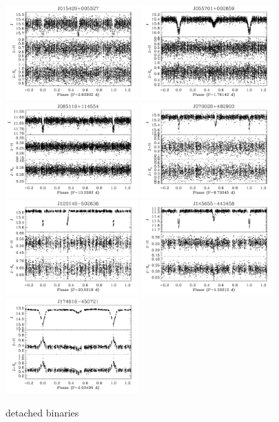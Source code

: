 \documentclass[]{emulateapj}
\begin{document}
\begin{figure}[]
\centering
\includegraphics[width=2.0in]{new_plots/bb3_0}
\includegraphics[width=2.0in]{new_plots/bb3_2}
\includegraphics[width=2.0in]{new_plots/bb3_3}
\includegraphics[width=2.0in]{new_plots/bb3_6}
\includegraphics[width=2.0in]{new_plots/bb3_10}
\includegraphics[width=2.0in]{new_plots/bb3_14}
\includegraphics[width=2.0in]{new_plots/bb3_16}
\caption{detached binaries}
\label{bin1}
\end{figure}
\end{document}
